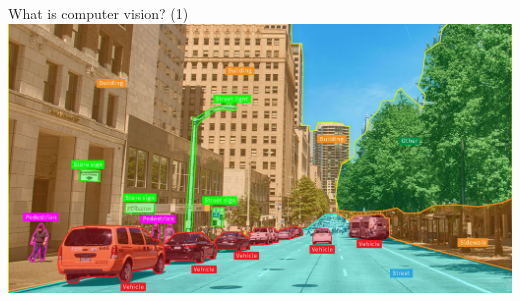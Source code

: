 \documentclass[default, aspectratio=169]{beamer}
\begin{document}
	\begin{frame}{What is computer vision? (1)}
		\centering
		\includegraphics[keepaspectratio, scale=0.3]{pic/computer_vision.jpeg}		
		
	\end{frame}
\end{document}
